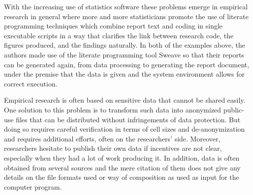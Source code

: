 \documentclass{acm_proc_article-sp}
\begin{document}
With the increasing use of statistics software \cite{RePEc_hum_wpaper_sfb649dp2011_020}
these problems emerge in empirical research in general where more and more statisticians promote the use of literate programming techniques  
\cite{leisch2011executable}
\cite{rossini2003literate}
which combine report text and coding in single executable scripts in a way that clarifies the link between research code, the figures produced, and the findings naturally.
In both of the examples above, the authors made use of the literate programming tool Sweave \cite{lmucs_papers_Leisch_2002} 
so that their reports can be generated again, from data processing to generating the report document, under the premise that the data is given and the system environment allows for correct execution.


Empirical research is often based on sensitive data that cannot be shared easily.
One solution to this problem is to transform such data into anonymized public-use files that can be distributed without infringements of data protection.
But doing so requires careful verification in terms of cell sizes and de-anonymization and requires additional efforts, often on the researchers' side.
Moreover, researchers hesitate to publish their own data if incentives are not clear, especially when they had a lot of work producing it.
In addition, data is often obtained from several sources and the mere citation of them does not give any details on the file formats used or way of composition as used as input for the computer program.
\end{document}
